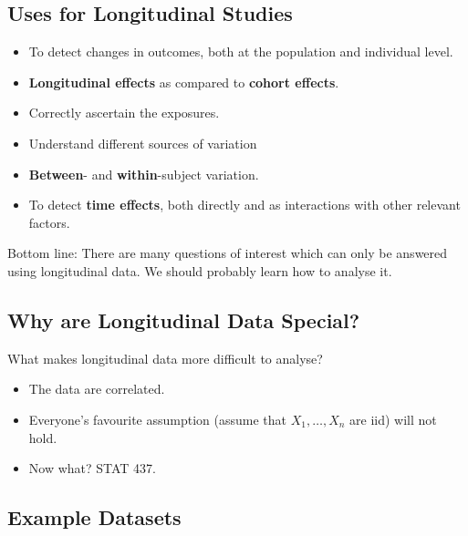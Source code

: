 \subsection{Uses for Longitudinal Studies}
\begin{itemize}
    \item To detect changes in outcomes, both at the population and individual level.
    \item \textbf{Longitudinal effects} as compared to \textbf{cohort effects}.
    \item Correctly ascertain the exposures.
    \item Understand different sources of variation
    \item \textbf{Between}- and \textbf{within}-subject variation.
    \item To detect \textbf{time effects}, both directly and as interactions with other relevant
          factors.
\end{itemize}
Bottom line: There are many questions of interest which can only be answered using
longitudinal data. We should probably learn how to analyse it.
\subsection{Why are Longitudinal Data Special?}
What makes longitudinal data more difficult to analyse?
\begin{itemize}
    \item The data are correlated.
    \item Everyone's favourite assumption
          (assume that $ X_1,\ldots,X_n $ are iid) will not hold.
    \item Now what? STAT 437.
\end{itemize}
\subsection{Example Datasets}

